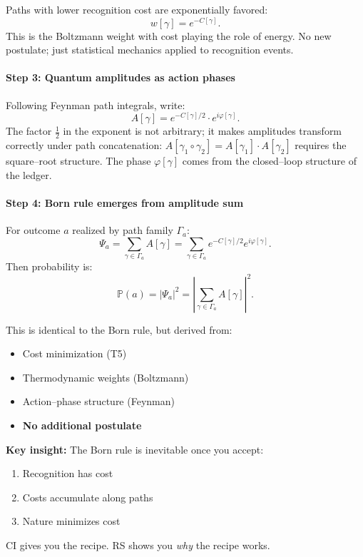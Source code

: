 \documentclass[11pt]{article}
\begin{document}
Paths with lower recognition cost are exponentially favored:
\begin{equation}
  w[\gamma] = e^{-C[\gamma]}.
\end{equation}
This is the Boltzmann weight with cost playing the role of energy. No new postulate; just statistical mechanics applied to recognition events.

\paragraph{Step 3: Quantum amplitudes as action phases}

Following Feynman path integrals, write:
\begin{equation}
  A[\gamma] = e^{-C[\gamma]/2} \cdot e^{i\varphi[\gamma]}.
\end{equation}
The factor $\tfrac{1}{2}$ in the exponent is not arbitrary; it makes amplitudes transform correctly under path concatenation: $A[\gamma_1 \circ \gamma_2] = A[\gamma_1] \cdot A[\gamma_2]$ requires the square--root structure. The phase $\varphi[\gamma]$ comes from the closed--loop structure of the ledger.

\paragraph{Step 4: Born rule emerges from amplitude sum}

For outcome $a$ realized by path family $\Gamma_a$:
\begin{equation}
  \Psi_a = \sum_{\gamma\in\Gamma_a} A[\gamma] = \sum_{\gamma\in\Gamma_a} e^{-C[\gamma]/2} e^{i\varphi[\gamma]}.
\end{equation}
Then probability is:
\begin{equation}\label{eq:born}
  \mathbb{P}(a) = |\Psi_a|^2 = \left|\sum_{\gamma\in\Gamma_a} A[\gamma]\right|^2.
\end{equation}

This is identical to the Born rule, but derived from:
\begin{itemize}[nosep]
  \item Cost minimization (T5)
  \item Thermodynamic weights (Boltzmann)
  \item Action--phase structure (Feynman)
  \item \textbf{No additional postulate}
\end{itemize}

\begin{rsbox}
\textbf{Key insight:} The Born rule is inevitable once you accept:
\begin{enumerate}[nosep]
  \item Recognition has cost
  \item Costs accumulate along paths
  \item Nature minimizes cost
\end{enumerate}
CI gives you the recipe. RS shows you \emph{why} the recipe works.
\end{rsbox}
\end{document}
